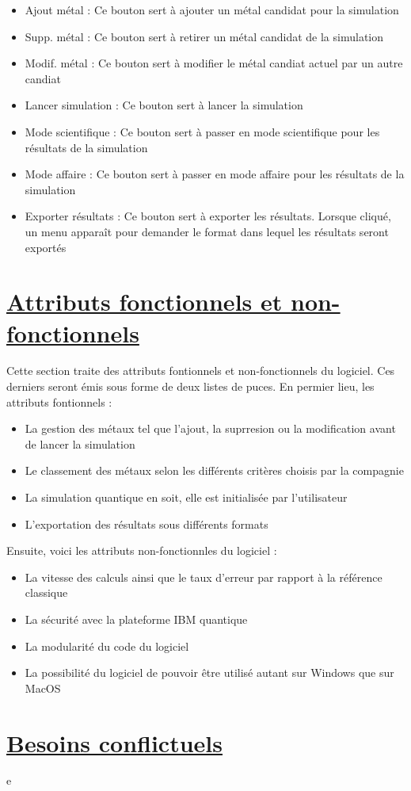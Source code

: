 \documentclass[11pt]{article}
\begin{document}
\begin{itemize}
  \item Ajout métal : Ce bouton sert à ajouter un métal candidat pour la simulation
  \item Supp. métal : Ce bouton sert à retirer un métal candidat de la simulation
  \item Modif. métal : Ce bouton sert à modifier le métal candiat actuel par un autre candiat
  \item Lancer simulation : Ce bouton sert à lancer la simulation
  \item Mode scientifique : Ce bouton sert à passer en mode scientifique pour les résultats de la simulation
  \item Mode affaire : Ce bouton sert à passer en mode affaire pour les résultats de la simulation
  \item Exporter résultats : Ce bouton sert à exporter les résultats. Lorsque cliqué, un menu apparaît pour demander le format dans lequel les résultats seront exportés
\end{itemize}
\pagebreak


\section{\underline{Attributs fonctionnels et non-fonctionnels}}
Cette section traite des attributs fontionnels et non-fonctionnels du logiciel. Ces derniers seront émis sous forme de deux listes de puces. En permier lieu, les attributs fontionnels :

\begin{itemize}
  \item La gestion des métaux tel que l'ajout, la suprresion ou la modification avant de lancer la simulation
  \item Le classement des métaux selon les différents critères choisis par la compagnie
  \item La simulation quantique en soit, elle est initialisée par l'utilisateur
  \item L'exportation des résultats sous différents formats
\end{itemize}
Ensuite, voici les attributs non-fonctionnles du logiciel :

\begin{itemize}
  \item La vitesse des calculs ainsi que le taux d'erreur par rapport à la référence classique
  \item La sécurité avec la plateforme IBM quantique
  \item La modularité du code du logiciel
  \item La possibilité du logiciel de pouvoir être utilisé autant sur Windows que sur MacOS
\end{itemize}


\section{\underline{Besoins conflictuels}}
e
\end{document}
